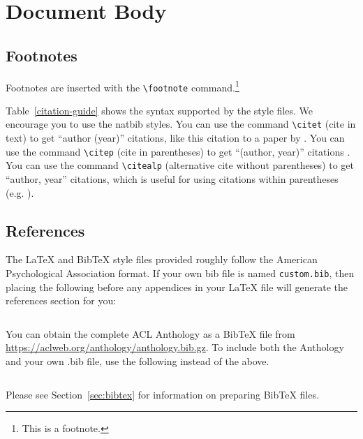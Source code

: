 \documentclass[11pt]{article}
\begin{document}
\section{Document Body}

\subsection{Footnotes}

Footnotes are inserted with the \verb|\footnote| command.\footnote{This is a footnote.}



Table~\ref{citation-guide} shows the syntax supported by the style files.
We encourage you to use the natbib styles.
You can use the command \verb|\citet| (cite in text) to get ``author (year)'' citations, like this citation to a paper by \citet{Gusfield:97}.
You can use the command \verb|\citep| (cite in parentheses) to get ``(author, year)'' citations \citep{Gusfield:97}.
You can use the command \verb|\citealp| (alternative cite without parentheses) to get ``author, year'' citations, which is useful for using citations within parentheses (e.g. \citealp{Gusfield:97}).

\subsection{References}

\nocite{Ando2005,andrew2007scalable,rasooli-tetrault-2015}

The \LaTeX{} and Bib\TeX{} style files provided roughly follow the American Psychological Association format.
If your own bib file is named \texttt{custom.bib}, then placing the following before any appendices in your \LaTeX{} file will generate the references section for you:
\begin{quote}
  \begin{verbatim}

\end{verbatim}
\end{quote}

You can obtain the complete ACL Anthology as a Bib\TeX{} file from \url{https://aclweb.org/anthology/anthology.bib.gz}.
To include both the Anthology and your own .bib file, use the following instead of the above.
\begin{quote}
  \begin{verbatim}
\end{verbatim}
\end{quote}

Please see Section~\ref{sec:bibtex} for information on preparing Bib\TeX{} files.
\end{document}
